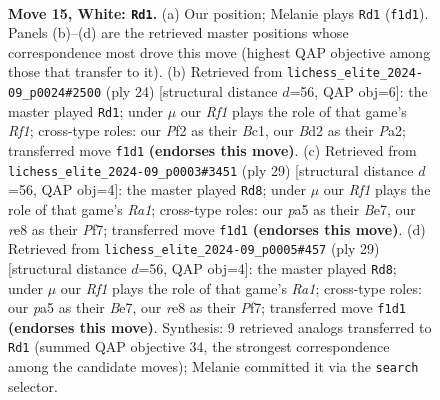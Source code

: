\documentclass[11pt]{article}
\begin{document}
\clearpage

\begin{figure}[p]\centering
\begin{subfigure}{0.46\textwidth}\centering
\resizebox{\linewidth}{!}{%
\newchessgame
\chessboard[
  setfen={rnb1r3/1p3ppp/1k2pn2/pNb5/P6P/1B2P3/1P1B1PP1/RN3RK1 w - - 7 15},
  showmover=false,
  pgfstyle=straightmove, color=movearrow, markmove={f1-d1}
]}
\caption{}
\end{subfigure}\hfill
\begin{subfigure}{0.46\textwidth}\centering
\resizebox{\linewidth}{!}{%
\newchessgame
\chessboard[
  setfen={r1b4r/pp2kppp/3bpn2/8/8/2P2N2/PPB2PPP/R1B2RK1 w - - 4 13},
  showmover=false,
  pgfstyle=straightmove, color=movearrow, markmove={f1-d1}
]}
\caption{}
\end{subfigure}
\\[4pt]
\begin{subfigure}{0.46\textwidth}\centering
\resizebox{\linewidth}{!}{%
\newchessgame
\chessboard[
  setfen={r3k2r/2p1bppp/p3b3/1pn1P3/8/5N2/PPB2PPP/R1BR2K1 b kq - 0 15},
  showmover=false,
  pgfstyle=straightmove, color=movearrow, markmove={a8-d8}
]}
\caption{}
\end{subfigure}\hfill
\begin{subfigure}{0.46\textwidth}\centering
\resizebox{\linewidth}{!}{%
\newchessgame
\chessboard[
  setfen={r3k2r/2p1bppp/p3b3/1pn1P3/8/5N2/PPB2PPP/R1BR2K1 b kq - 0 15},
  showmover=false,
  pgfstyle=straightmove, color=movearrow, markmove={a8-d8}
]}
\caption{}
\end{subfigure}
\caption{\textbf{Move 15, White: \texttt{Rd1}.} (a) Our position; Melanie plays \texttt{Rd1} (\texttt{f1d1}). Panels (b)--(d) are the retrieved master positions whose correspondence most drove this move (highest QAP objective among those that transfer to it). (b) Retrieved from \texttt{lichess\_elite\_2024-09\_p0024\#2500} (ply 24) [structural distance $d$=56, QAP obj=6]: the master played \texttt{Rd1}; under $\mu$ our \emph{Rf1} plays the role of that game's \emph{Rf1}; cross-type roles: our \emph{P}f2 as their \emph{B}c1, our \emph{B}d2 as their \emph{P}a2; transferred move \texttt{f1d1} \textbf{(endorses this move)}. (c) Retrieved from \texttt{lichess\_elite\_2024-09\_p0003\#3451} (ply 29) [structural distance $d$=56, QAP obj=4]: the master played \texttt{Rd8}; under $\mu$ our \emph{Rf1} plays the role of that game's \emph{Ra1}; cross-type roles: our \emph{p}a5 as their \emph{B}e7, our \emph{r}e8 as their \emph{P}f7; transferred move \texttt{f1d1} \textbf{(endorses this move)}. (d) Retrieved from \texttt{lichess\_elite\_2024-09\_p0005\#457} (ply 29) [structural distance $d$=56, QAP obj=4]: the master played \texttt{Rd8}; under $\mu$ our \emph{Rf1} plays the role of that game's \emph{Ra1}; cross-type roles: our \emph{p}a5 as their \emph{B}e7, our \emph{r}e8 as their \emph{P}f7; transferred move \texttt{f1d1} \textbf{(endorses this move)}. Synthesis: 9 retrieved analogs transferred to \texttt{Rd1} (summed QAP objective 34, the strongest correspondence among the candidate moves); Melanie committed it via the \texttt{search} selector.}
\label{fig:thought-m28}
\end{figure}
\end{document}
